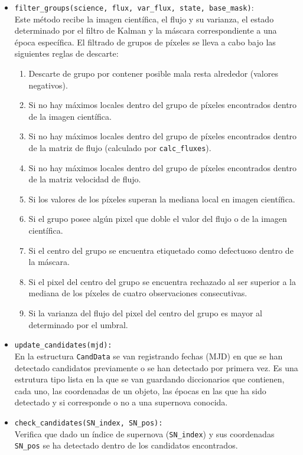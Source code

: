 \begin{itemize}
\item \texttt{filter\_groups(science, flux, var\_flux, state, base\_mask)}:\\
Este m\'etodo recibe la imagen cient\'ifica, el flujo y su varianza, el estado determinado por el filtro de Kalman y la m\'ascara correspondiente a una \'epoca espec\'ifica. 
El filtrado de grupos de p\'ixeles se lleva a cabo bajo las siguientes reglas de descarte: 

\begin{enumerate}
\item Descarte de grupo por contener posible mala resta alrededor (valores negativos).  
\item	Si no hay m\'aximos locales dentro del grupo de p\'ixeles encontrados dentro de la imagen cient\'ifica.
\item	Si no hay m\'aximos locales dentro del grupo de p\'ixeles encontrados dentro de la matriz de flujo (calculado por \texttt{calc\_fluxes}).
\item	Si no hay m\'aximos locales dentro del grupo de p\'ixeles encontrados dentro de la matriz velocidad de flujo.
\item 	Si los valores de los p\'ixeles superan la mediana local en imagen cient\'ifica.
\item	Si el grupo posee alg\'un pixel que doble el valor del flujo o de la imagen cient\'ifica.
\item	Si el centro del grupo se encuentra etiquetado como defectuoso dentro de la m\'ascara.
\item	Si el pixel del centro del grupo se encuentra rechazado al ser superior a la mediana de los p\'ixeles de cuatro observaciones consecutivas.
\item	Si la varianza del flujo del pixel del centro del grupo es mayor al determinado por el umbral.
\end{enumerate} 
\item \texttt{update\_candidates(mjd):}\\
En la estructura \texttt{CandData} se van registrando fechas (MJD) en que se han detectado candidatos previamente o se han detectado por primera vez. Es una estrutura tipo lista en la que se van guardando diccionarios que contienen, cada uno, las coordenadas de un objeto, las \'epocas en las que ha sido detectado y si corresponde o no a una supernova conocida.

\item \texttt{check\_candidates(SN\_index, SN\_pos):}\\
Verifica que dado un \'indice de supernova (\texttt{SN\_index}) y sus coordenadas \texttt{SN\_pos} se ha detectado dentro de los candidatos encontrados. 


\end{itemize}

